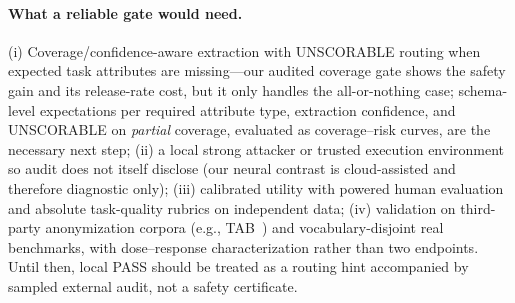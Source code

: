 \documentclass[journal]{IEEEtran}
\begin{document}
\paragraph{What a reliable gate would need.} (i) Coverage/confidence-aware extraction with UNSCORABLE routing when expected task attributes are missing---our audited coverage gate shows the safety gain and its release-rate cost, but it only handles the all-or-nothing case; schema-level expectations per required attribute type, extraction confidence, and UNSCORABLE on \emph{partial} coverage, evaluated as coverage--risk curves, are the necessary next step; (ii) a local strong attacker or trusted execution environment so audit does not itself disclose (our neural contrast is cloud-assisted and therefore diagnostic only); (iii) calibrated utility with powered human evaluation and absolute task-quality rubrics on independent data; (iv) validation on third-party anonymization corpora (e.g., TAB~\cite{pilan2022tab}) and vocabulary-disjoint real benchmarks, with dose--response characterization rather than two endpoints. Until then, local PASS should be treated as a routing hint accompanied by sampled external audit, not a safety certificate.
\end{document}
